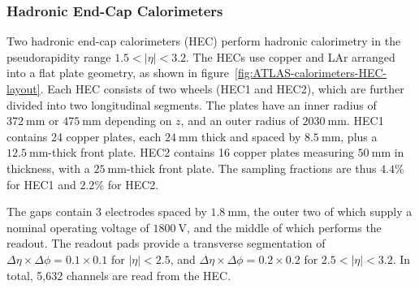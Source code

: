 \subsubsection{Hadronic End-Cap Calorimeters}\label{sec:ATLAS-calorimeters-HEC}
Two hadronic end-cap calorimeters (HEC) perform hadronic calorimetry in the pseudorapidity range $1.5<|\eta|<3.2$. The HECs use copper and LAr arranged into a flat plate geometry, as shown in figure~\ref{fig:ATLAS-calorimeters-HEC-layout}. Each HEC consists of two wheels (HEC1 and HEC2), which are further divided into two longitudinal segments.  The plates have an inner radius of $\SI{372}{\milli\meter}$ or $\SI{475}{\milli\meter}$ depending on $z$, and an outer radius of $\SI{2030}{\milli\meter}$. HEC1 contains 24 copper plates, each $\SI{24}{\milli\meter}$ thick and spaced by $\SI{8.5}{\milli\meter}$, plus a $\SI{12.5}{\milli\meter}$-thick front plate. HEC2 contains 16 copper plates measuring $\SI{50}{\milli\meter}$ in thickness, with a $\SI{25}{\milli\meter}$-thick front plate. The sampling fractions are thus $4.4\%$ for HEC1 and $2.2\%$ for HEC2. 

The gaps contain 3 electrodes spaced by $\SI{1.8}{\milli\meter}$, the outer two of which supply a nominal operating voltage of $\SI{1800}{\volt}$, and the middle of which performs the readout. The readout pads provide a transverse segmentation of $\Delta\eta\times\Delta\phi=0.1\times0.1$ for $|\eta|<2.5$, and $\Delta\eta\times\Delta\phi=0.2\times0.2$ for $2.5<|\eta|<3.2$. In total, 5,632 channels are read from the HEC. 

